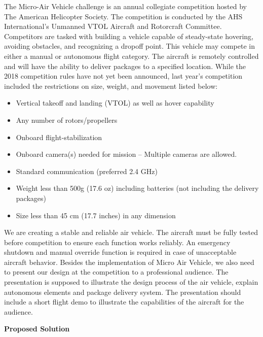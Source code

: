\documentclass[10pt,letterpaper,onecolumn]{article}
\begin{document}
The Micro-Air Vehicle challenge is an annual collegiate competition hosted by The American Helicopter Society. The competition is conducted by the AHS International’s Unmanned VTOL Aircraft and Rotorcraft Committee. Competitors are tasked with building a vehicle capable of steady-state hovering, avoiding obstacles, and recognizing a dropoff point. This vehicle may compete in either a manual or autonomous flight category. The aircraft is remotely controlled and will have the ability to deliver packages to a specified location. While the 2018 competition rules have not yet been announced, last year’s competition included the restrictions on size, weight, and movement listed below: 
\begin{itemize}
\item Vertical takeoff and landing (VTOL) as well as hover capability
\item Any number of rotors/propellers
\item Onboard flight-stabilization 
\item Onboard camera(s) needed for mission – Multiple cameras are allowed.
\item Standard communication (preferred 2.4 GHz)
\item Weight less than 500g (17.6 oz) including batteries (not including the delivery packages)
\item Size less than 45 cm (17.7 inches) in any dimension
\end{itemize}

We are creating a stable and reliable air vehicle. The aircraft must be fully tested before competition to ensure each function works reliably. An emergency shutdown and manual override function is required in case of unacceptable aircraft behavior. Besides the implementation of Micro Air Vehicle, we also need to present our design at the competition to a professional audience. The presentation is supposed to illustrate the design process of the air vehicle, explain autonomous elements and package delivery system. The presentation should include a short flight demo to illustrate the capabilities of the aircraft for the audience. 


\begin{center}
\large
\textbf{Proposed Solution}
\end{center}
\end{document}
